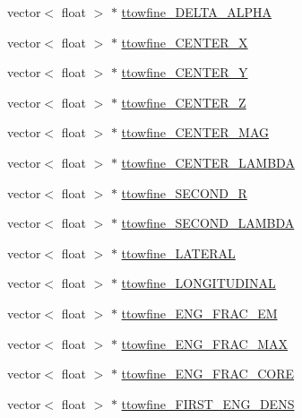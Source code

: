 \begin{DoxyCompactItemize}
\item 
vector$<$ float $>$ $\ast$ \hyperlink{classJetAnalysisExample_aa338b3d4a190b1fed75e030d61d6668a}{ttowfine\+\_\+\+D\+E\+L\+T\+A\+\_\+\+A\+L\+P\+HA}
\item 
vector$<$ float $>$ $\ast$ \hyperlink{classJetAnalysisExample_a3da7eff0ae738df2a32299b58844f453}{ttowfine\+\_\+\+C\+E\+N\+T\+E\+R\+\_\+X}
\item 
vector$<$ float $>$ $\ast$ \hyperlink{classJetAnalysisExample_af7e670fdc033d0671f6eac1b965faa71}{ttowfine\+\_\+\+C\+E\+N\+T\+E\+R\+\_\+Y}
\item 
vector$<$ float $>$ $\ast$ \hyperlink{classJetAnalysisExample_ab3268ccc904b8339c7cc68832e5f0e84}{ttowfine\+\_\+\+C\+E\+N\+T\+E\+R\+\_\+Z}
\item 
vector$<$ float $>$ $\ast$ \hyperlink{classJetAnalysisExample_ac23a1a65f5dbd858e6afec481df0cd6c}{ttowfine\+\_\+\+C\+E\+N\+T\+E\+R\+\_\+\+M\+AG}
\item 
vector$<$ float $>$ $\ast$ \hyperlink{classJetAnalysisExample_ae8bd42dd62ec0fdf1d8eb824f73aa876}{ttowfine\+\_\+\+C\+E\+N\+T\+E\+R\+\_\+\+L\+A\+M\+B\+DA}
\item 
vector$<$ float $>$ $\ast$ \hyperlink{classJetAnalysisExample_a4ec4c10f73ac651c26770b87962bb7be}{ttowfine\+\_\+\+S\+E\+C\+O\+N\+D\+\_\+R}
\item 
vector$<$ float $>$ $\ast$ \hyperlink{classJetAnalysisExample_a2dee47926c20d5348b1757ec1494faf8}{ttowfine\+\_\+\+S\+E\+C\+O\+N\+D\+\_\+\+L\+A\+M\+B\+DA}
\item 
vector$<$ float $>$ $\ast$ \hyperlink{classJetAnalysisExample_aabd80e0d880634e8262c357134a10bc5}{ttowfine\+\_\+\+L\+A\+T\+E\+R\+AL}
\item 
vector$<$ float $>$ $\ast$ \hyperlink{classJetAnalysisExample_a64ce23f51562ac1eda8b57b4ae430c65}{ttowfine\+\_\+\+L\+O\+N\+G\+I\+T\+U\+D\+I\+N\+AL}
\item 
vector$<$ float $>$ $\ast$ \hyperlink{classJetAnalysisExample_af81ac5499a4c650b45fa0c67e3324fa3}{ttowfine\+\_\+\+E\+N\+G\+\_\+\+F\+R\+A\+C\+\_\+\+EM}
\item 
vector$<$ float $>$ $\ast$ \hyperlink{classJetAnalysisExample_af7c88d43da2bc9cf1a650d623d8d8d5f}{ttowfine\+\_\+\+E\+N\+G\+\_\+\+F\+R\+A\+C\+\_\+\+M\+AX}
\item 
vector$<$ float $>$ $\ast$ \hyperlink{classJetAnalysisExample_ac2d3beba4f2bfc40babf729f6bcca865}{ttowfine\+\_\+\+E\+N\+G\+\_\+\+F\+R\+A\+C\+\_\+\+C\+O\+RE}
\item 
vector$<$ float $>$ $\ast$ \hyperlink{classJetAnalysisExample_afa183c62dc17f8758aa322ec182d0725}{ttowfine\+\_\+\+F\+I\+R\+S\+T\+\_\+\+E\+N\+G\+\_\+\+D\+E\+NS}

\end{DoxyCompactItemize}

